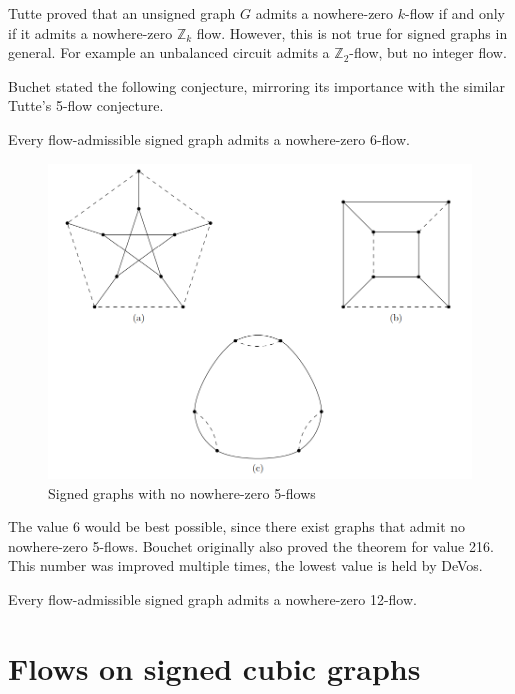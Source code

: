 Tutte\cite{tutte-proof} proved that an unsigned graph $G$ admits a nowhere-zero $k$-flow if and only if it admits a nowhere-zero $\mathbb{Z}_k$ flow. 
However, this is not true for signed graphs in general. For example an unbalanced circuit admits a $\mathbb{Z}_2$-flow, but no integer flow.

Buchet stated the following conjecture, mirroring its importance with the similar Tutte's 5-flow conjecture.

\begin{conjecture}
    Every flow-admissible signed graph admits a nowhere-zero 6-flow.
\end{conjecture}

\begin{figure}[ht]\label{fig:no-5-flow}
    \centering
    \includegraphics[scale=0.65]{images/petersen-no-5.png}
    \caption{Signed graphs with no nowhere-zero 5-flows}
\end{figure}

The value 6 would be best possible, since there exist graphs that admit no nowhere-zero 5-flows.
Bouchet originally also proved the theorem for value 216. This number was improved multiple times, 
the lowest value is held by DeVos\cite{devos}.

\begin{theorem}[DeVos]
    Every flow-admissible signed graph admits a nowhere-zero 12-flow.
\end{theorem}

\section{Flows on signed cubic graphs}

